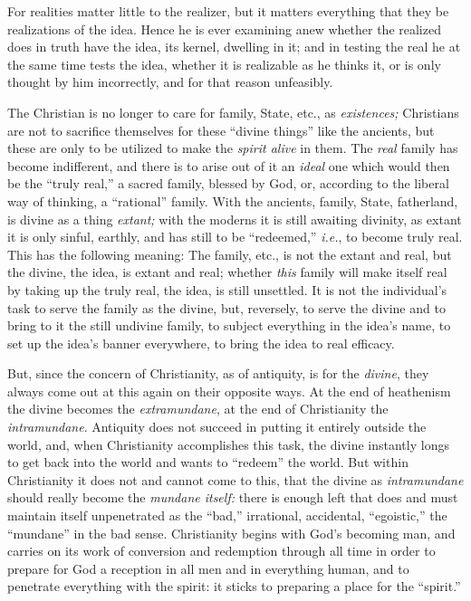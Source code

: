 \documentclass[12pt,a4paper]{book}
\begin{document}
For realities matter little to the realizer, but it matters everything that 
they be realizations of the idea. Hence he is ever examining anew whether the 
realized does in truth have the idea, its kernel, dwelling in it; and in 
testing the real he at the same time tests the idea, whether it is realizable 
as he thinks it, or is only thought by him incorrectly, and for that reason 
unfeasibly.

The Christian is no longer to care for family, State, etc., as 
\textit{existences;} Christians are not to sacrifice themselves for these 
``divine things'' like the ancients, but these are only to be utilized to 
make the \textit{spirit alive} in them. The \textit{real} family has become 
indifferent, and there is to arise out of it an \textit{ideal} one which would 
then be the ``truly real,'' a sacred family, blessed by God, or, according 
to the liberal way of thinking, a ``rational'' family. With the ancients, 
family, State, fatherland, is divine as a thing \textit{extant;} with the 
moderns it is still awaiting divinity, as extant it is only sinful, earthly, 
and has still to be ``redeemed,'' \textit{i.e.}, to become truly real. This 
has the following meaning: The family, etc., is not the extant and real, but 
the divine, the idea, is extant and real; whether \textit{this} family will 
make itself real by taking up the truly real, the idea, is still unsettled. It 
is not the individual's task to serve the family as the divine, but, 
reversely, to serve the divine and to bring to it the still undivine family, 
to subject everything in the idea's name, to set up the idea's banner 
everywhere, to bring the idea to real efficacy.

But, since the concern of Christianity, as of antiquity, is for the 
\textit{divine}, they always come out at this again on their opposite ways. At 
the end of heathenism the divine becomes the \textit{extramundane}, at the end 
of Christianity the \textit{intramundane}. Antiquity does not succeed in 
putting it entirely outside the world, and, when Christianity accomplishes 
this task, the divine instantly longs to get back into the world and wants to 
``redeem'' the world. But within Christianity it does not and cannot come to 
this, that the divine as \textit{intramundane} should really become the 
\textit{mundane itself:} there is enough left that does and must maintain 
itself unpenetrated as the ``bad,'' irrational, accidental, ``egoistic,'' 
the ``mundane'' in the bad sense. Christianity begins with God's becoming 
man, and carries on its work of conversion and redemption through all time in 
order to prepare for God a reception in all men and in everything human, and 
to penetrate everything with the spirit: it sticks to preparing a place for 
the ``spirit.''
\end{document}
